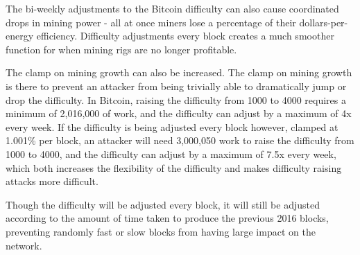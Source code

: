 \documentclass[twocolumn]{article}
\begin{document}
The bi-weekly adjustments to the Bitcoin difficulty can also cause coordinated drops in mining power - all at once miners lose a percentage of their dollars-per-energy efficiency.
Difficulty adjustments every block creates a much smoother function for when mining rigs are no longer profitable.

The clamp on mining growth can also be increased.
The clamp on mining growth is there to prevent an attacker from being trivially able to dramatically jump or drop the difficulty.
In Bitcoin, raising the difficulty from 1000 to 4000 requires a minimum of 2,016,000 of work, and the difficulty can adjust by a maximum of 4x every week.
If the difficulty is being adjusted every block however, clamped at 1.001\% per block, an attacker will need 3,000,050 work to raise the difficulty from 1000 to 4000, and the difficulty can adjust by a maximum of 7.5x every week, which both increases the flexibility of the difficulty and makes difficulty raising attacks more difficult.

Though the difficulty will be adjusted every block, it will still be adjusted according to the amount of time taken to produce the previous 2016 blocks, preventing randomly fast or slow blocks from having large impact on the network.



\end{document}
